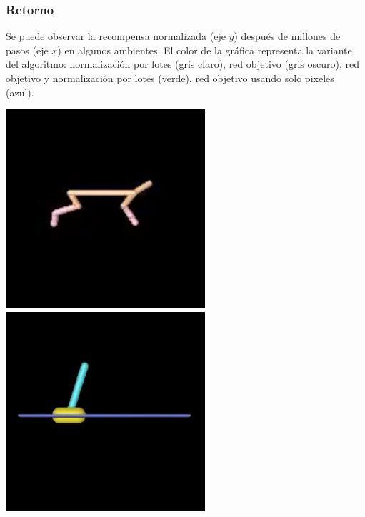 \documentclass[
    11pt,
    aspectratio=169,
]{beamer}
\begin{document}
\begin{frame}
\frametitle{Retorno}

Se puede observar la recompensa normalizada (eje $y$) después de millones de pasos (eje $x$) en algunos ambientes. El color de la gráfica representa la variante del algoritmo: normalización por lotes (gris claro), red objetivo (gris oscuro), red objetivo y normalización por lotes (verde), red objetivo usando solo pixeles (azul).

\begin{center}
\includegraphics[scale=0.2]{Images/cheetah}
\hspace{5mm}
\includegraphics[scale=0.2]{Images/cartpole}


\end{center}
\end{frame}
\end{document}
